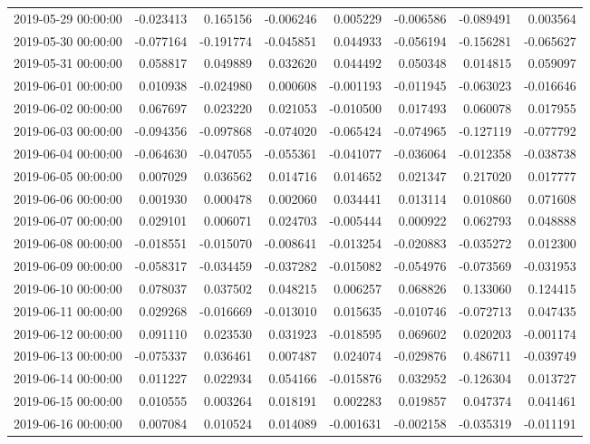 \begin{tabular}{lrrrrrrr}
2019-05-29 00:00:00 & -0.023413 & 0.165156 & -0.006246 & 0.005229 & -0.006586 & -0.089491 & 0.003564 \\
2019-05-30 00:00:00 & -0.077164 & -0.191774 & -0.045851 & 0.044933 & -0.056194 & -0.156281 & -0.065627 \\
2019-05-31 00:00:00 & 0.058817 & 0.049889 & 0.032620 & 0.044492 & 0.050348 & 0.014815 & 0.059097 \\
2019-06-01 00:00:00 & 0.010938 & -0.024980 & 0.000608 & -0.001193 & -0.011945 & -0.063023 & -0.016646 \\
2019-06-02 00:00:00 & 0.067697 & 0.023220 & 0.021053 & -0.010500 & 0.017493 & 0.060078 & 0.017955 \\
2019-06-03 00:00:00 & -0.094356 & -0.097868 & -0.074020 & -0.065424 & -0.074965 & -0.127119 & -0.077792 \\
2019-06-04 00:00:00 & -0.064630 & -0.047055 & -0.055361 & -0.041077 & -0.036064 & -0.012358 & -0.038738 \\
2019-06-05 00:00:00 & 0.007029 & 0.036562 & 0.014716 & 0.014652 & 0.021347 & 0.217020 & 0.017777 \\
2019-06-06 00:00:00 & 0.001930 & 0.000478 & 0.002060 & 0.034441 & 0.013114 & 0.010860 & 0.071608 \\
2019-06-07 00:00:00 & 0.029101 & 0.006071 & 0.024703 & -0.005444 & 0.000922 & 0.062793 & 0.048888 \\
2019-06-08 00:00:00 & -0.018551 & -0.015070 & -0.008641 & -0.013254 & -0.020883 & -0.035272 & 0.012300 \\
2019-06-09 00:00:00 & -0.058317 & -0.034459 & -0.037282 & -0.015082 & -0.054976 & -0.073569 & -0.031953 \\
2019-06-10 00:00:00 & 0.078037 & 0.037502 & 0.048215 & 0.006257 & 0.068826 & 0.133060 & 0.124415 \\
2019-06-11 00:00:00 & 0.029268 & -0.016669 & -0.013010 & 0.015635 & -0.010746 & -0.072713 & 0.047435 \\
2019-06-12 00:00:00 & 0.091110 & 0.023530 & 0.031923 & -0.018595 & 0.069602 & 0.020203 & -0.001174 \\
2019-06-13 00:00:00 & -0.075337 & 0.036461 & 0.007487 & 0.024074 & -0.029876 & 0.486711 & -0.039749 \\
2019-06-14 00:00:00 & 0.011227 & 0.022934 & 0.054166 & -0.015876 & 0.032952 & -0.126304 & 0.013727 \\
2019-06-15 00:00:00 & 0.010555 & 0.003264 & 0.018191 & 0.002283 & 0.019857 & 0.047374 & 0.041461 \\
2019-06-16 00:00:00 & 0.007084 & 0.010524 & 0.014089 & -0.001631 & -0.002158 & -0.035319 & -0.011191 \\

\end{tabular}
